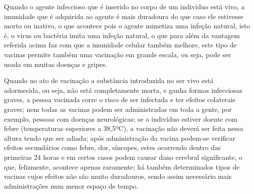 \documentclass[10pt,a4paper,titlepage]{report}
\begin{document}
 \begin{minipage}[t]{7cm}
 	Quando o agente infeccioso que é inserido no corpo de um indivíduo está vivo, a imunidade que é adquirida ao agente é mais duradoura do que caso ele estivesse morto ou inativo, o que acontece pois o agente mimetiza uma infeção natural, isto é, o vírus ou bactéria imita uma infeção natural, o que para além da vantagem referida acima faz com que a imunidade celular também melhore, este tipo de vacinas permite também uma vacinação em grande escala, ou seja, pode ser usada em muitas doenças e gripes. 
 \end{minipage}
 \hspace{2cm}
 \begin{minipage}[t]{7cm}
 	Quando no ato de vacinação a substância introduzida no ser vivo está adormecida, ou seja, não está completamente morta, e ganha formas infecciosas graves, a pessoa vacinada corre o risco de ser infectada e ter efeitos colaterais graves; nem todas as vacinas podem ser administradas em toda a gente, por exemplo, pessoas com doenças neurológicas; se o indivíduo estiver doente com febre (temperaturas superiores a 38,5ºC),  a vacinação não deverá ser feita nessa altura tendo que ser adiada; após administração da vacina podem-se verificar efeitos secundários como febre, dor, síncopes, estes ocorrendo dentro das primeiras 24 horas e em certos casos podem causar dano cerebral significante, o que, felizmente, acontece apenas raramente; há também determinados tipos de vacinas cujos efeitos não são muito duradouros, sendo assim necessário mais administrações num menor espaço de tempo.
  \end{minipage}
\end{document}
